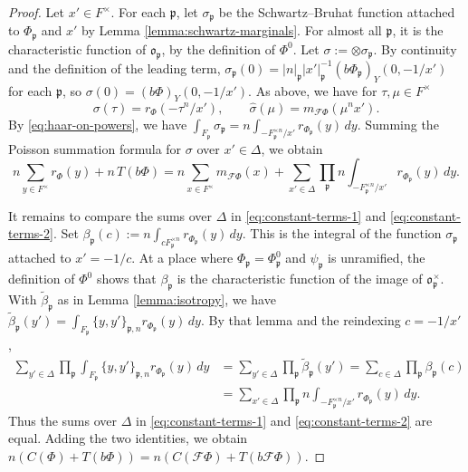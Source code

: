 \documentclass[reqno]{amsart}
\theoremstyle{plain}
\theoremstyle{definition}
\theoremstyle{itplain}
\numberwithin{equation}{section}
\numberwithin{theorem}{section}
\begin{document}
\begin{proof}
  Let $x' \in F^\times$.  For each $\mathfrak{p}$, let $\sigma_{\mathfrak{p}}$ be the Schwartz--Bruhat function attached to $\Phi_{\mathfrak{p}}$ and $x'$ by Lemma \ref{lemma:schwartz-marginals}.  For almost all $\mathfrak{p}$, it is the characteristic function of $\mathfrak{o}_{\mathfrak{p}}$, by the definition of $\Phi^0$.  Let $\sigma := \otimes \sigma_{\mathfrak{p}}$.  By continuity and the definition of the leading term, $\sigma_{\mathfrak{p}}(0) = \lvert n \rvert_{\mathfrak{p}} \lvert x' \rvert_{\mathfrak{p}}^{-1} (b \Phi_{\mathfrak{p}})_Y(0, -1/x')$ for each $\mathfrak{p}$, so $\sigma(0) = (b \Phi)_Y(0, -1/x')$.  As above, we have for $\tau, \mu \in F^\times$
  \begin{equation*}
    \sigma(\tau) = r_\Phi(- \tau^n / x'),
    \qquad
    \hat{\sigma}(\mu) = m_{\mathcal{F} \Phi}(\mu^n x').
  \end{equation*}
  By \eqref{eq:haar-on-powers}, we have $\int_{F_{\mathfrak{p}}} \sigma_{\mathfrak{p}} = n \int_{- F_{\mathfrak{p}}^{\times n} / x'} r_{\Phi_{\mathfrak{p}}}(y) \, d y$.  Summing the Poisson summation formula for $\sigma$ over $x' \in \Delta$, we obtain
  \begin{equation}\label{eq:constant-terms-2}
    n \sum_{y \in F^\times} r_\Phi(y) + n \, T(b \Phi)
    =
    n \sum_{x \in F^\times} m_{\mathcal{F} \Phi}(x)
    + \sum_{x' \in \Delta} \prod_{\mathfrak{p}} n \int_{- F_{\mathfrak{p}}^{\times n} / x'} r_{\Phi_{\mathfrak{p}}}(y) \, d y.
  \end{equation}

  It remains to compare the sums over $\Delta$ in \eqref{eq:constant-terms-1} and \eqref{eq:constant-terms-2}.  Set $\beta_{\mathfrak{p}}(c) := n \int_{c F_{\mathfrak{p}}^{\times n}} r_{\Phi_{\mathfrak{p}}}(y) \, d y$.  This is the integral of the function $\sigma_{\mathfrak{p}}$ attached to $x' = -1/c$.  At a place where $\Phi_{\mathfrak{p}} = \Phi_{\mathfrak{p}}^0$ and $\psi_{\mathfrak{p}}$ is unramified, the definition of $\Phi^0$ shows that $\beta_{\mathfrak{p}}$ is the characteristic function of the image of $\mathfrak{o}_{\mathfrak{p}}^\times$.  With $\tilde{\beta}_{\mathfrak{p}}$ as in Lemma \ref{lemma:isotropy}, we have $\tilde{\beta}_{\mathfrak{p}}(y') = \int_{F_{\mathfrak{p}}} \{y, y'\}_{\mathfrak{p}, n} r_{\Phi_{\mathfrak{p}}}(y) \, d y$.  By that lemma and the reindexing $c = -1/x'$,
  \begin{align*}
    \sum_{y' \in \Delta} \prod_{\mathfrak{p}} \int_{F_{\mathfrak{p}}} \{y, y'\}_{\mathfrak{p}, n} r_{\Phi_{\mathfrak{p}}}(y) \, d y
    &= \sum_{y' \in \Delta} \prod_{\mathfrak{p}} \tilde{\beta}_{\mathfrak{p}}(y')
      = \sum_{c \in \Delta} \prod_{\mathfrak{p}} \beta_{\mathfrak{p}}(c) \\
    &= \sum_{x' \in \Delta} \prod_{\mathfrak{p}} n \int_{- F_{\mathfrak{p}}^{\times n} / x'} r_{\Phi_{\mathfrak{p}}}(y) \, d y.
  \end{align*}
  Thus the sums over $\Delta$ in \eqref{eq:constant-terms-1} and \eqref{eq:constant-terms-2} are equal.  Adding the two identities, we obtain $n (C(\Phi) + T(b \Phi)) = n (C(\mathcal{F} \Phi) + T(b \mathcal{F} \Phi))$.
\end{proof}
\end{document}
